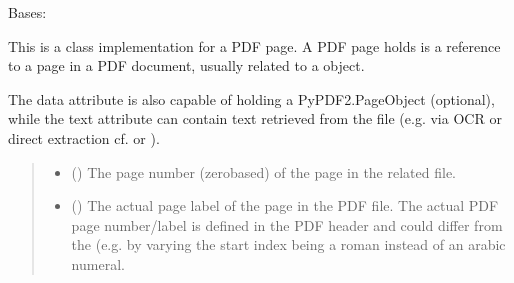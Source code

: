 \documentclass[letterpaper,10pt,english]{sphinxmanual}
\begin{document}
\begin{fulllineitems}
\label{\detokenize{generated/bp_text.pdf:bp_text.pdf.PdfPage}}
\pysigstartsignatures
\pysiglinewithargsret
{}
{\sphinxparamcomma {}\sphinxparamcomma {}\sphinxparamcomma {}\sphinxparamcomma {}\sphinxparamcomma {}}
{}
\pysigstopsignatures
\sphinxAtStartPar
Bases: {\hyperref[\detokenize{generated/bp_text.page:bp_text.page.Page}]{}}

\sphinxAtStartPar
This is a class implementation for a PDF page.  A PDF page holds is a
reference to a page in a PDF document, usually related to a
{\hyperref[\detokenize{generated/bp_text.pdf:bp_text.pdf.PdfFile}]{}} object.

\sphinxAtStartPar
The data attribute is also capable of holding a PyPDF2.PageObject
(optional), while the text attribute can contain text retrieved from the
file (e.g. via OCR or direct extraction \textendash{}
cf. {\hyperref[\detokenize{generated/bp_text.pdf:bp_text.pdf.PdfPage.extract_text}]{}} or {\hyperref[\detokenize{generated/bp_text.pdf:bp_text.pdf.PdfFile.extract_text}]{}}).
\begin{quote}\begin{description}
\begin{itemize}
\item {} 
\sphinxAtStartPar
{} () \textendash{} The page number (zero\sphinxhyphen{}based) of the page in the related
file.

\item {} 
\sphinxAtStartPar
{} () \textendash{} The actual page label of the page in the PDF file.
The actual PDF page number/label is defined in the PDF header and could
differ from the  (e.g. by varying the start index being a
roman instead of an arabic numeral.


\end{itemize}
\end{description}
\end{quote}
\end{fulllineitems}
\end{document}
